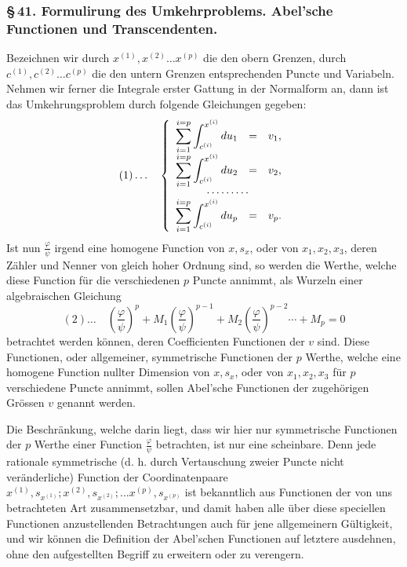 \documentclass[10pt]{article}
\begin{document}
\subsubsection*{\S\,41. Formulirung des Umkehrproblems. Abel'sche Functionen und Transcendenten.}

Bezeichnen wir durch \(x^{(1)},x^{(2)}\ldots x^{(p)}\) die den obern Grenzen, durch \(c^{(1)},c^{(2)}\ldots c^{(p)}\) die den untern Grenzen entsprechenden Puncte und Variabeln. Nehmen wir ferner die Integrale erster Gattung in der Normalform an, dann ist das Umkehrungsproblem durch folgende Gleichungen gegeben:
\[
(1)\ldots\quad
\left\{\begin{array}{rcl}
\displaystyle\sum_{i=1}^{i=p}\int_{c^{(i)}}^{x^{(i)}}du_1&=&v_1,\\[0.35em]
\displaystyle\sum_{i=1}^{i=p}\int_{c^{(i)}}^{x^{(i)}}du_2&=&v_2,\\[-0.1em]
\multicolumn{3}{c}{\cdots\cdots\cdots}\\[-0.1em]
\displaystyle\sum_{i=1}^{i=p}\int_{c^{(i)}}^{x^{(i)}}du_p&=&v_p.
\end{array}\right.
\]
Ist nun \(\frac{\varphi}{\psi}\) irgend eine homogene Function von \(x,s_x\), oder von \(x_1,x_2,x_3\), deren Zähler und Nenner von gleich hoher Ordnung sind, so werden die Werthe, welche diese Function für die verschiedenen \(p\) Puncte annimmt, als Wurzeln einer algebraischen Gleichung
\[
(2)\ldots\quad
\left(\frac{\varphi}{\psi}\right)^p+M_1\left(\frac{\varphi}{\psi}\right)^{p-1}+M_2\left(\frac{\varphi}{\psi}\right)^{p-2}\cdots+M_p=0
\]
betrachtet werden können, deren Coefficienten Functionen der \(v\) sind. Diese Functionen, oder allgemeiner, symmetrische Functionen der \(p\) Werthe, welche eine homogene Function nullter Dimension von \(x,s_x\), oder von \(x_1,x_2,x_3\) für \(p\) verschiedene Puncte annimmt, sollen Abel'sche Functionen der zugehörigen Grössen \(v\) genannt werden.

Die Beschränkung, welche darin liegt, dass wir hier nur symmetrische Functionen der \(p\) Werthe einer Function \(\frac{\varphi}{\psi}\) betrachten, ist nur eine scheinbare. Denn jede rationale symmetrische (d. h. durch Vertauschung zweier Puncte nicht veränderliche) Function der Coordinatenpaare \(x^{(1)},s_{x^{(1)}};x^{(2)},s_{x^{(2)}};\ldots x^{(p)},s_{x^{(p)}}\) ist bekanntlich aus Functionen der von uns betrachteten Art zusammensetzbar, und damit haben alle über diese speciellen Functionen anzustellenden Betrachtungen auch für jene allgemeinern Gültigkeit, und wir können die Definition der Abel'schen Functionen auf letztere ausdehnen, ohne den aufgestellten Begriff zu erweitern oder zu verengern.
\end{document}
